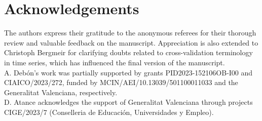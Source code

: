 \section{Acknowledgements}

The authors express their gratitude to the anonymous referees for their thorough review and valuable feedback on the manuscript. Appreciation is also extended to Christoph Bergmeir for clarifying doubts related to cross-validation terminology in time series, which has influenced the final version of the manuscript.\\
A. Debón's work was partially supported by grants PID2023-152106OB-I00 and CIAICO/2023/272, funded by MCIN/AEI/10.13039/501100011033 and the Generalitat Valenciana, respectively.\\
D. Atance acknowledges the support of Generalitat Valenciana through projects CIGE/2023/7 (Conselleria de Educación, Universidades y Empleo).



\address{David Atance\\
  Universidad de Alcalá\\
  Departmento de Economía y Dirección de Empresas\\
  Facultad de Ciencias Económicas, Empresariales y Turismo\\
  Plaza San Diego s/n, 6020, Alcalá de Henares\\
  Spain\\
  ORCiD: 0000-0001-5860-0584\\
  }

\address{Ana Debón\\
  Universitat Politècnica de València\\
  Centro de Gestión de la Calidad y del Cambio\\
  Facultad de Administración y Dirección de Empresas\\
  Camino de Vera, s/n, 46022, Valencia\\
  Spain\\
  ORCiD: 0000-0002-5116-289X\\
  }
